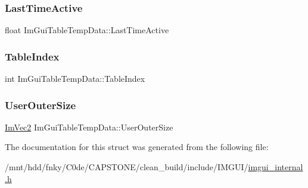 \subsubsection{\texorpdfstring{Last\+Time\+Active}{LastTimeActive}}
{\footnotesize\ttfamily float Im\+Gui\+Table\+Temp\+Data\+::\+Last\+Time\+Active}

\mbox{\label{structImGuiTableTempData_af849fb1f0115dd53be49419b355487a3}} 
\subsubsection{\texorpdfstring{Table\+Index}{TableIndex}}
{\footnotesize\ttfamily int Im\+Gui\+Table\+Temp\+Data\+::\+Table\+Index}

\mbox{\label{structImGuiTableTempData_aaf4e14bfbf965747f8925825dcb13255}} 
\subsubsection{\texorpdfstring{User\+Outer\+Size}{UserOuterSize}}
{\footnotesize\ttfamily \hyperlink{structImVec2}{Im\+Vec2} Im\+Gui\+Table\+Temp\+Data\+::\+User\+Outer\+Size}



The documentation for this struct was generated from the following file\+:\begin{DoxyCompactItemize}
\item 
/mnt/hdd/fnky/\+C0de/\+C\+A\+P\+S\+T\+O\+N\+E/clean\+\_\+build/include/\+I\+M\+G\+U\+I/\hyperlink{imgui__internal_8h}{imgui\+\_\+internal.\+h}\end{DoxyCompactItemize}
